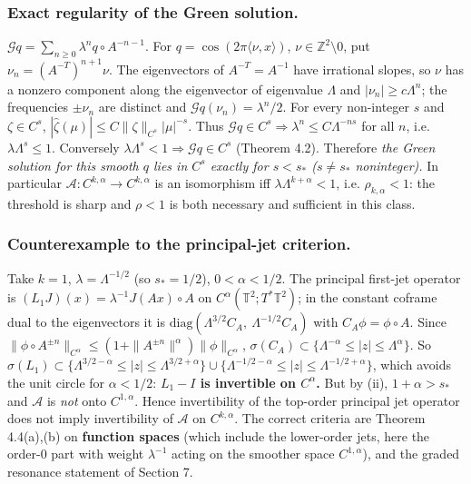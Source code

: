 \documentclass[11pt,a4paper]{article}
\theoremstyle{plain}
\theoremstyle{definition}
\theoremstyle{remark}
\numberwithin{equation}{section}
\numberwithin{figure}{section}
\begin{document}
\subsubsection{Exact regularity of the Green solution.} $\mathcal Gq=\sum_{n\ge0}\lambda^nq\circ A^{-n-1}$. For $q=\cos(2\pi\langle\nu,x\rangle)$, $\nu\in\mathbb Z^2\setminus0$, put $\nu_n=(A^{-T})^{n+1}\nu$. The eigenvectors of $A^{-T}=A^{-1}$ have irrational slopes, so $\nu$ has a nonzero component along the eigenvector of eigenvalue $\Lambda$ and $|\nu_n|\ge c\Lambda^n$; the frequencies $\pm\nu_n$ are distinct and $\widehat{\mathcal Gq}(\nu_n)=\lambda^n/2$. For every non-integer $s$ and $\zeta\in C^s$, $|\hat\zeta(\mu)|\le C\|\zeta\|_{C^s}|\mu|^{-s}$. Thus $\mathcal Gq\in C^s\Rightarrow\lambda^n\le C\Lambda^{-ns}$ for all $n$, i.e. $\lambda\Lambda^s\le1$. Conversely $\lambda\Lambda^s<1\Rightarrow\mathcal Gq\in C^s$ (Theorem 4.2). Therefore \textit{the Green solution for this smooth $q$ lies in $C^s$ exactly for $s<s_*$ ($s\ne s_*$ noninteger).} In particular $\mathcal A:C^{k,\alpha}\to C^{k,\alpha}$ is an isomorphism iff $\lambda\Lambda^{k+\alpha}<1$, i.e. $\rho_{k,\alpha}<1$: the threshold is sharp and $\rho<1$ is both necessary and sufficient in this class.

\subsubsection{Counterexample to the principal-jet criterion.} Take $k=1$, $\lambda=\Lambda^{-1/2}$ (so $s_*=1/2$), $0<\alpha<1/2$. The principal first-jet operator is $(L_1J)(x)=\lambda^{-1}J(Ax)\circ A$ on $C^\alpha(\mathbb T^2;T^*\mathbb T^2)$; in the constant coframe dual to the eigenvectors it is $\mathrm{diag}(\Lambda^{3/2}C_A,\ \Lambda^{-1/2}C_A)$ with $C_A\phi=\phi\circ A$. Since $\|\phi\circ A^{\pm n}\|_{C^\alpha}\le(1+\|A^{\pm n}\|^\alpha)\|\phi\|_{C^\alpha}$, $\sigma(C_A)\subset\{\Lambda^{-\alpha}\le|z|\le\Lambda^\alpha\}$. So $\sigma(L_1)\subset\{\Lambda^{3/2-\alpha}\le|z|\le\Lambda^{3/2+\alpha}\}\cup\{\Lambda^{-1/2-\alpha}\le|z|\le\Lambda^{-1/2+\alpha}\}$, which avoids the unit circle for $\alpha<1/2$: \textbf{$L_1-I$ is invertible on $C^\alpha$.} But by (ii), $1+\alpha>s_*$ and $\mathcal A$ is \textit{not} onto $C^{1,\alpha}$. Hence invertibility of the top-order principal jet operator does not imply invertibility of $\mathcal A$ on $C^{k,\alpha}$. The correct criteria are Theorem 4.4(a),(b) on \textbf{function spaces} (which include the lower-order jets, here the order-$0$ part with weight $\lambda^{-1}$ acting on the smoother space $C^{1,\alpha}$), and the graded resonance statement of Section 7.
\end{document}
